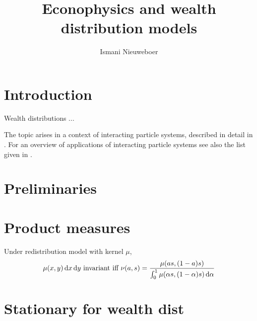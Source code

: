 \documentclass{article}
\title{Econophysics and wealth distribution models}
\author{Ismani Nieuweboer}
\begin{document}
\maketitle











\section*{Introduction}
Wealth distributions ...

The topic arises in a context of interacting particle systems, described in detail in  \cite{liggett2012interacting, liggett2013stochastic}. For an overview of applications of interacting particle systems see also the list given in \cite{frankredig2014}.



\section{Preliminaries}


\section{Product measures}

Under redistribution model with kernel $\mu$,
\[
\mu(x, y) \mathop{}\!\mathrm{d} x \mathop{}\!\mathrm{d} y  \text{ invariant iff }
\nu(a, s) = \frac{ \mu(as, (1-a)s) }{\int_0^1 \mu(\alpha s, (1-\alpha)s) \mathop{}\!\mathrm{d} \alpha}
\]

\section{Stationary for wealth dist}
\end{document}
